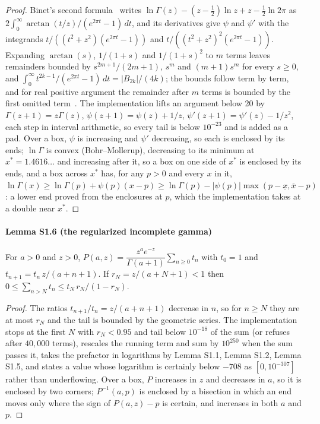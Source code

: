 \documentclass[preprint,11pt,a4paper]{elsarticle}
\theoremstyle{definition}
\begin{document}
\begin{proof}
Binet's second formula~\citep[\S5.9]{DLMF} writes $\ln\Gamma(z)-(z-\tfrac12)\ln z+z-\tfrac12\ln2\pi$ as $2\int_0^\infty\arctan(t/z)/(e^{2\pi t}-1)\,dt$, and its derivatives give $\psi$ and $\psi'$ with the integrands $t/((t^2+z^2)(e^{2\pi t}-1))$ and $t/((t^2+z^2)^2(e^{2\pi t}-1))$. Expanding $\arctan(s)$, $1/(1+s)$ and $1/(1+s)^2$ to $m$ terms leaves remainders bounded by $s^{2m+1}/(2m+1)$, $s^{m}$ and $(m+1)s^{m}$ for every $s\ge0$, and $\int_0^\infty t^{2k-1}/(e^{2\pi t}-1)\,dt=|B_{2k}|/(4k)$; the bounds follow term by term, and for real positive argument the remainder after $m$ terms is bounded by the first omitted term~\citep[\S5.11(ii)]{DLMF}. The implementation lifts an argument below 20 by $\Gamma(z+1)=z\Gamma(z)$, $\psi(z+1)=\psi(z)+1/z$, $\psi'(z+1)=\psi'(z)-1/z^2$, each step in interval arithmetic, so every tail is below $10^{-23}$ and is added as a pad. Over a box, $\psi$ is increasing and $\psi'$ decreasing, so each is enclosed by its ends; $\ln\Gamma$ is convex (Bohr--Mollerup), decreasing to its minimum at $x^*=1.4616\ldots$ and increasing after it, so a box on one side of $x^*$ is enclosed by its ends, and a box across $x^*$ has, for any $p>0$ and every $x$ in it, $\ln\Gamma(x)\ge\ln\Gamma(p)+\psi(p)(x-p)\ge\ln\Gamma(p)-|\psi(p)|\max(p-\underline x,\overline x-p)$: a lower end proved from the enclosures at $p$, which the implementation takes at a double near $x^*$.
\end{proof}

\paragraph{Lemma S1.6 (the regularized incomplete gamma)}
For $a>0$ and $z>0$, $P(a,z)=\dfrac{z^{a}e^{-z}}{\Gamma(a+1)}\sum_{n\ge0}t_n$ with $t_0=1$ and $t_{n+1}=t_n\,z/(a+n+1)$. If $r_N=z/(a+N+1)<1$ then $0\le\sum_{n>N}t_n\le t_N\,r_N/(1-r_N)$.

\begin{proof}
The ratios $t_{n+1}/t_n=z/(a+n+1)$ decrease in $n$, so for $n\ge N$ they are at most $r_N$ and the tail is bounded by the geometric series. The implementation stops at the first $N$ with $r_N<0.95$ and tail below $10^{-18}$ of the sum (or refuses after $40{,}000$ terms), rescales the running term and sum by $10^{250}$ when the sum passes it, takes the prefactor in logarithms by Lemma S1.1, Lemma S1.2, Lemma S1.5, and states a value whose logarithm is certainly below $-708$ as $[0,10^{-307}]$ rather than underflowing. Over a box, $P$ increases in $z$ and decreases in $a$, so it is enclosed by two corners; $P^{-1}(a,p)$ is enclosed by a bisection in which an end moves only where the sign of $P(a,z)-p$ is certain, and increases in both $a$ and $p$.
\end{proof}
\end{document}
